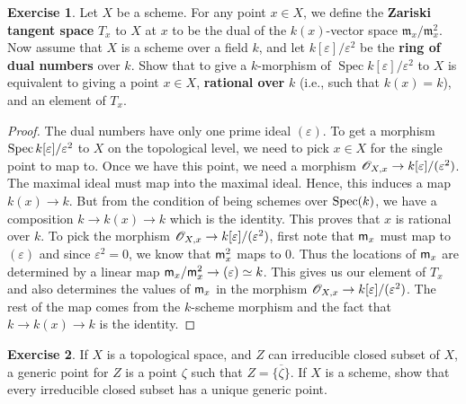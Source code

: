 \documentclass[]{pcmi}
\theoremstyle{plain}
\theoremstyle{definition}
\newtheorem{Exercise}{Exercise}
\theoremstyle{remark}
\begin{document}
\begin{Exercise}
    Let $X$ be a scheme. For any point $x \in X$, we define the \textbf{Zariski tangent space} $T_x$ to $X$ at $x$ to be the dual of the $k(x)$-vector space $\mathfrak{m}_x/\mathfrak{m}_x^2$. Now assume that $X$ is a scheme over a field $k$, and let $k[\varepsilon]/\varepsilon^2$ be the \textbf{ring of dual numbers} over $k$. Show that to give a $k$-morphism of $\operatorname{Spec} k[\varepsilon]/\varepsilon^2$ to $X$ is equivalent to giving a point $x \in X$, \textbf{rational over} $k$ (i.e., such that $k(x) = k$), and an element of $T_x$.
\end{Exercise}

\begin{proof}
    The dual numbers have only one prime ideal $(\varepsilon)$. To get a morphism $\operatorname{Spec} k[\varepsilon] / \varepsilon^2$ to $X$ on the topological level, we need to pick $x \in X$ for the single point to map to. Once we have this point, we need a morphism $\mathscr{O}_{X, x} \to k[\varepsilon] / (\varepsilon^2)$. The maximal ideal must map into the maximal ideal. Hence, this induces a map $k(x) \to k$. But from the condition of being schemes over $\operatorname{Spec}(k)$, we have a composition $k \to k(x) \to k$ which is the identity. This proves that $x$ is rational over $k$. To pick the morphism $\mathscr{O}_{X, x} \to k[\varepsilon] / (\varepsilon^2)$, first note that $\mathsf{m}_x$ must map to $(\varepsilon)$ and since $\varepsilon^2 = 0$, we know that $\mathsf{m}_x^2$ maps to $0$. Thus the locations of $\mathsf{m}_x$ are determined by a linear map $\mathsf{m}_x / \mathsf{m}_x^2 \to (\varepsilon) \simeq k$. This gives us our element of $T_x$ and also determines the values of $\mathsf{m}_x$ in the morphism $\mathscr{O}_{X, x} \to k[\varepsilon] / (\varepsilon^2)$. The rest of the map comes from the $k$-scheme morphism and the fact that $k \to k(x) \to k$ is the identity. 
\end{proof}

\begin{Exercise}
    If $X$ is a topological space, and $Z$ can irreducible closed subset of $X$, a generic point for $Z$ is a point $\zeta$ such that $Z = \overline{\{\zeta\}}$. If $X$ is a scheme, show that every irreducible closed subset has a unique generic point. 
\end{Exercise}
\end{document}
